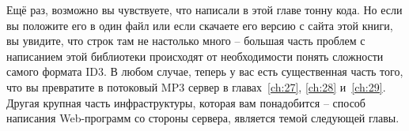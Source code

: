 Ещё раз, возможно вы чувствуете, что написали в этой главе тонну кода. Но если вы положите
его в один файл или если скачаете его версию с сайта этой книги, вы увидите, что строк там
не настолько много -- большая часть проблем с написанием этой библиотеки происходят от
необходимости понять сложности самого формата ID3. В любом случае, теперь у вас есть
существенная часть того, что вы превратите в потоковый MP3 сервер в главах~\ref{ch:27},
\ref{ch:28} и~\ref{ch:29}. Другая крупная часть инфраструктуры, которая вам понадобится --
способ написания Web-программ со стороны сервера, является темой следующей главы.


